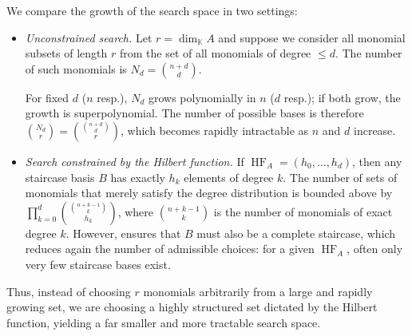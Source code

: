 \documentclass[a4paper,11p]{amsart}
\newcommand{\K}{\mathbb K}
\begin{document}
We compare the growth of the search space in two settings:
\begin{itemize}
    \item 
\emph{Unconstrained search.}
Let $r = \dim_\K A$ and suppose we consider all monomial subsets of length $r$ from the set of all monomials of degree $\le d$. The number of such monomials is 
$N_d = \binom{n+d}{d}
$.

For fixed $d$ ($n$ resp.), $N_d$ grows polynomially in $n$ ($d$ resp.); if both grow, the growth is superpolynomial.  
The number of possible bases is therefore $
\binom{N_d}{r} = \binom{\binom{n+d}{d}}{r}$,
which becomes rapidly intractable as $n$ and $d$ increase.

\item \emph{Search constrained by the Hilbert function.}
If $\operatorname{HF}_A = (h_0,\ldots,h_d)$, then any staircase basis $B$ has exactly $h_k$ elements of degree $k$.  
The number of sets of monomials that merely satisfy the degree distribution is bounded above by $
\prod_{k=0}^d \binom{\binom{n+k-1}{k}}{h_k}$, 
where $\binom{n+k-1}{k}$ is the number of monomials of exact degree $k$.  
However,  ensures that $B$ must also be a complete staircase, which reduces again the number of admissible choices: for a given $\operatorname{HF}_A$, often only very few staircase bases exist.  

\end{itemize}
Thus, instead of choosing $r$ monomials arbitrarily from a large and rapidly growing set, we are choosing a highly structured set dictated by the Hilbert function, yielding a far smaller and more tractable search space.
\end{document}
